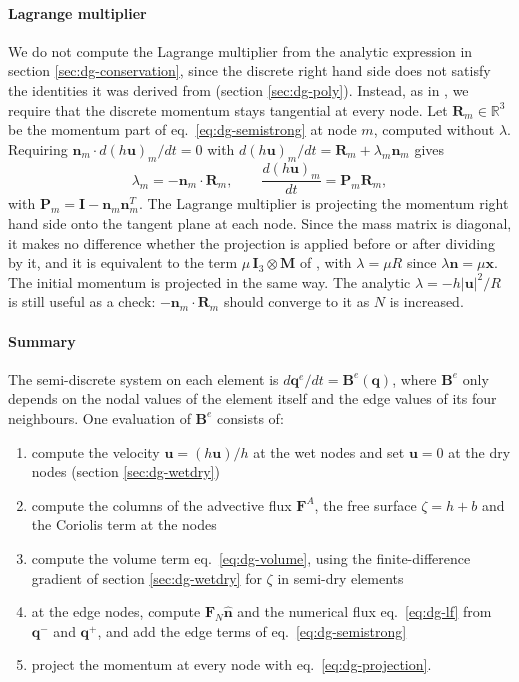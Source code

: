\paragraph{Lagrange multiplier}
We do not compute the Lagrange multiplier from the analytic expression in section \ref{sec:dg-conservation}, since the discrete right hand side does not satisfy the identities it was derived from (section \ref{sec:dg-poly}). Instead, as in \cite{GIRALDO2002499,bonev2018discontinuous}, we require that the discrete momentum stays tangential at every node. Let $\mathbf{R}_m\in\mathbb{R}^3$ be the momentum part of eq.~\eqref{eq:dg-semistrong} at node $m$, computed without $\lambda$. Requiring $\mathbf{n}_m\cdot d(h\mathbf{u})_m/dt = 0$ with $d(h\mathbf{u})_m/dt = \mathbf{R}_m + \lambda_m\mathbf{n}_m$ gives
\begin{equation}\label{eq:dg-projection}
    \lambda_m = -\mathbf{n}_m\cdot\mathbf{R}_m, \qquad \frac{d(h\mathbf{u})_m}{dt} = \mathbf{P}_m\mathbf{R}_m,
\end{equation}
with $\mathbf{P}_m = \mathbf{I} - \mathbf{n}_m\mathbf{n}_m^T$. The Lagrange multiplier is  projecting the momentum right hand side onto the tangent plane at each node. Since the mass matrix is diagonal, it makes no difference whether the projection is applied before or after dividing by it, and it is equivalent to the term $\mu\,\mathbf{I}_3\otimes\mathbf{M}$ of \cite{GIRALDO2002499}, with $\lambda = \mu R$ since $\lambda\mathbf{n} = \mu\mathbf{x}$. The initial momentum is projected in the same way. The analytic $\lambda = -h|\mathbf{u}|^2/R$ is still useful as a check: $-\mathbf{n}_m\cdot\mathbf{R}_m$ should converge to it as $N$ is increased.

\paragraph{Summary}
The semi-discrete system on each element is $d\mathbf{q}^e/dt = \mathbf{B}^e(\mathbf{q})$, where $\mathbf{B}^e$ only depends on the nodal values of the element itself and the edge values of its four neighbours. One evaluation of $\mathbf{B}^e$ consists of:
\begin{enumerate}
    \item compute the velocity $\mathbf{u} = (h\mathbf{u})/h$ at the wet nodes and set $\mathbf{u} = 0$ at the dry nodes (section \ref{sec:dg-wetdry})
    \item compute the columns of the advective flux $\mathbf{F}^A$, the free surface $\zeta = h + b$ and the Coriolis term at the nodes
    \item compute the volume term eq.~\eqref{eq:dg-volume}, using the finite-difference gradient of section \ref{sec:dg-wetdry} for $\zeta$ in semi-dry elements
    \item at the edge nodes, compute $\mathbf{F}_N\hat{\mathbf{n}}$ and the numerical flux eq.~\eqref{eq:dg-lf} from $\mathbf{q}^-$ and $\mathbf{q}^+$, and add the edge terms of eq.~\eqref{eq:dg-semistrong}
    \item project the momentum at every node with eq.~\eqref{eq:dg-projection}.
\end{enumerate}

